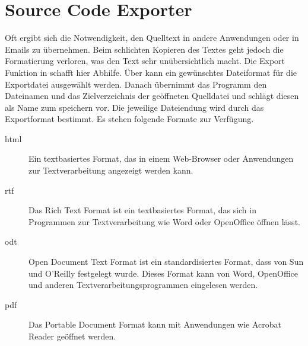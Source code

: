 \section{Source Code Exporter}

Oft ergibt sich die Notwendigkeit, den Quelltext in andere Anwendungen oder in Emails zu übernehmen. Beim schlichten Kopieren des Textes geht jedoch die Formatierung verloren, was den Text sehr unübersichtlich macht.
Die Export Funktion in \codeblocks schafft hier Abhilfe. Über  kann ein gewünschtes Dateiformat für die Exportdatei ausgewählt werden. Danach übernimmt das Programm den Dateinamen und das Zielverzeichnis der geöffneten Quelldatei und schlägt diesen als Name zum speichern vor. Die jeweilige Dateiendung wird durch das Exportformat bestimmt. Es stehen folgende Formate zur Verfügung.

\begin{description}
\item[html] Ein textbasiertes Format, das in einem Web-Browser oder Anwendungen zur Textverarbeitung angezeigt werden kann.
\item[rtf] Das Rich Text Format ist ein textbasiertes Format, das sich in Programmen zur Textverarbeitung wie Word oder OpenOffice öffnen lässt.
\item[odt] Open Document Text Format ist ein standardisiertes Format, dass von Sun und O'Reilly festgelegt wurde. Dieses Format kann von Word, OpenOffice und anderen Textverarbeitungsprogrammen eingelesen werden.
\item[pdf] Das Portable Document Format kann mit Anwendungen wie Acrobat Reader geöffnet werden.
\end{description}
